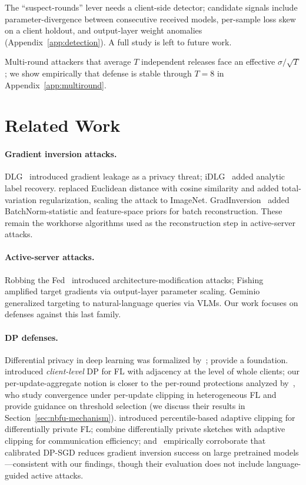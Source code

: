 \documentclass[11pt]{article}
\begin{document}
The ``suspect-rounds'' lever needs a client-side detector; candidate signals include parameter-divergence between consecutive received models, per-sample loss skew on a client holdout, and output-layer weight anomalies (Appendix~\ref{app:detection}). A full study is left to future work.

Multi-round attackers that average $T$ independent releases face an effective $\sigma/\sqrt{T}$; we show empirically that defense is stable through $T{=}8$ in Appendix~\ref{app:multiround}.


\section{Related Work}

\paragraph{Gradient inversion attacks.}
DLG~\citep{dlg2019} introduced gradient leakage as a privacy threat; iDLG~\citep{idlg2020} added analytic label recovery. \citet{ig2020} replaced Euclidean distance with cosine similarity and added total-variation regularization, scaling the attack to ImageNet. GradInversion~\citep{gradinversion2021} added BatchNorm-statistic and feature-space priors for batch reconstruction. These remain the workhorse algorithms used as the reconstruction step in active-server attacks.

\paragraph{Active-server attacks.}
Robbing the Fed~\citep{robbing2022} introduced architecture-modification attacks; Fishing~\citep{fishing2023} amplified target gradients via output-layer parameter scaling. Geminio~\citep{geminio2024} generalized targeting to natural-language queries via VLMs. Our work focuses on defenses against this last family.

\paragraph{DP defenses.}
Differential privacy in deep learning was formalized by~\citet{dpsgd2016}; \citet{differentialprivacy2014} provide a foundation. \citet{mcmahan2018learning} introduced \emph{client-level} DP for FL with adjacency at the level of whole clients; our per-update-aggregate notion is closer to the per-round protections analyzed by~\citet{zhang2021clipping}, who study convergence under per-update clipping in heterogeneous FL and provide guidance on threshold selection (we discuss their results in Section~\ref{sec:nbfu-mechanism}). \citet{andrew2021adaptive} introduced percentile-based adaptive clipping for differentially private FL; \citet{dpsfl2024} combine differentially private sketches with adaptive clipping for communication efficiency; and~\citet{dp_gia_eval2025} empirically corroborate that calibrated DP-SGD reduces gradient inversion success on large pretrained models---consistent with our findings, though their evaluation does not include language-guided active attacks.
\end{document}
